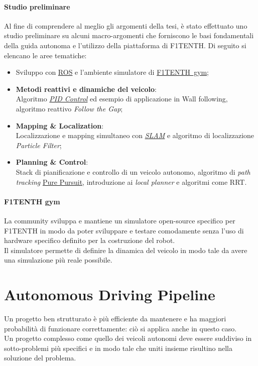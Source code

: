 \paragraph{Studio preliminare}
Al fine di comprendere al meglio gli argomenti della tesi, è stato effettuato uno studio preliminare su
alcuni macro-argomenti che forniscono le basi fondamentali della guida autonoma e l'utilizzo della
piattaforma di F1TENTH. 
\noindent Di seguito si elencano le aree tematiche:
\begin{itemize}
	\item Sviluppo con \hyperref[sec:ros]{ROS} e l'ambiente simulatore di
		\hyperref[par:gym]{F1TENTH~gym};
	\item \textbf{Metodi reattivi e dinamiche del veicolo}:\\
		Algoritmo \textit{\hyperref[par:pid]{PID Control}} ed esempio di applicazione in Wall
		following, algoritmo reattivo \textit{Follow the Gap};
	\item \textbf{Mapping \& Localization}:\\
		Localizzazione e mapping simultaneo con \textit{\hyperref[par:slam]{SLAM}} e algoritmo di
		localizzazione \textit{Particle Filter};
	\item \textbf{Planning \& Control}:\\
	      Stack di pianificazione e controllo di un veicolo autonomo, algoritmo di
		  \textit{path tracking} \hyperref[par:pp]{Pure Pursuit}, introduzione ai
	      \textit{local planner} e algoritmi come RRT.
\end{itemize}

\paragraph{F1TENTH gym}
\label{par:gym}
La community sviluppa e mantiene un simulatore open-source specifico per F1TENTH \cite{f1tenth-gym} in
modo da poter sviluppare e testare comodamente senza l'uso di hardware specifico definito per la
costruzione del robot.\\ Il simulatore permette di definire la dinamica del veicolo in modo tale da avere
una simulazione più reale possibile.

\section{Autonomous Driving Pipeline}
\label{sec:pipeline}
Un progetto ben strutturato è più efficiente da mantenere e ha maggiori probabilità
di funzionare correttamente: ciò si applica anche in questo caso.\\
Un progetto complesso come quello dei veicoli autonomi deve essere suddiviso in sotto-problemi
più specifici e in modo tale che uniti insieme risultino nella soluzione del problema.

